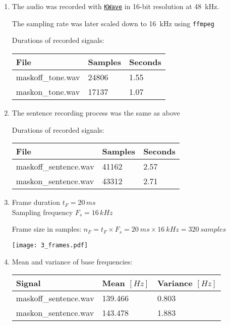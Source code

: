 \documentclass[a4paper, 11pt]{article}
\begin{document}
	\begin{enumerate}
		\item
		The audio was recorded with \texttt{\href{https://apps.kde.org/en/kwave}{KWave}} in 16-bit resolution at 48~kHz.

		The sampling rate was later scaled down to 16~kHz using \texttt{ffmpeg}

		Durations of recorded signals: \\
		\begin{tabular}{ | l | l | l | }
			\hline
			\textbf{File} & \textbf{Samples} & \textbf{Seconds} \\ \hline
			maskoff\_tone.wav & 24806            & 1.55             \\ \hline
			maskon\_tone.wav  & 17137            & 1.07             \\ \hline
		\end{tabular}

		\item
		The sentence recording process was the same as above

		Durations of recorded signals: \\
		\begin{tabular}{ | l | l | l | }
			\hline
			\textbf{File}     & \textbf{Samples} & \textbf{Seconds} \\ \hline
			maskoff\_sentence.wav & 41162            & 2.57             \\ \hline
			maskon\_sentence.wav  & 43312            & 2.71             \\ \hline
		\end{tabular}

		\item
		Frame duration $t_F = 20\,ms$ \\
		Sampling frequency $F_s = 16\,kHz$

		Frame size in samples: $n_F = t_F \times F_s = 20~ms \times 16~kHz = 320~samples$

		\texttt{[image: 3\_frames.pdf]}

		\item
		Mean and variance of base frequencies: \\
		\begin{tabular}{ | l | l | l | }
			\hline
			\textbf{Signal}    & \textbf{Mean} $[Hz]$ & \textbf{Variance} $[Hz]$ \\ \hline
			maskoff\_sentence.wav & 139.466              & 0.803                    \\ \hline
			maskon\_sentence.wav  & 143.478              & 1.883                    \\ \hline
		\end{tabular}


\end{enumerate}
\end{document}

